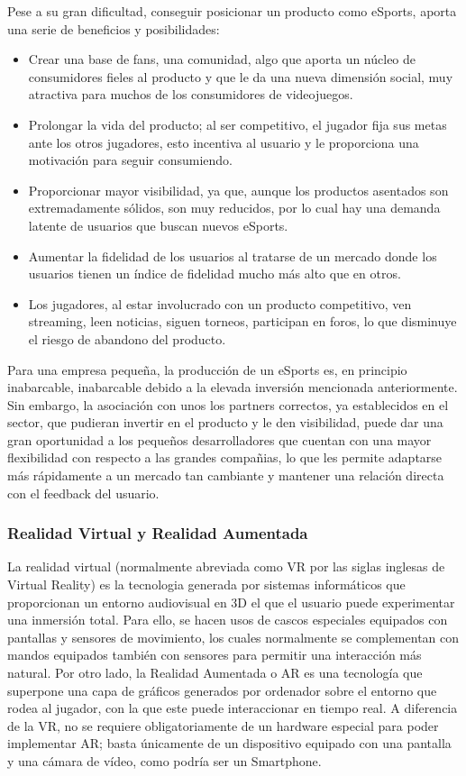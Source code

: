 Pese a su gran dificultad, conseguir posicionar un producto como eSports, aporta una serie de beneficios y posibilidades: 
\begin{itemize}
\item Crear una base de fans, una comunidad, algo que aporta un núcleo de consumidores fieles al producto y que le da una nueva dimensión social, muy atractiva para muchos de los consumidores de videojuegos.
\item Prolongar la vida del producto; al ser competitivo, el jugador fija sus metas ante los otros jugadores, esto incentiva al usuario y le proporciona una motivación para seguir consumiendo.
\item Proporcionar mayor visibilidad, ya que, aunque los productos asentados son extremadamente sólidos, son muy reducidos, por lo cual hay una demanda latente de usuarios que buscan nuevos eSports.
\item Aumentar la fidelidad de los usuarios al tratarse de un mercado donde los usuarios tienen un índice de fidelidad mucho más alto que en otros.
\item Los jugadores, al estar involucrado con un producto competitivo, ven streaming, leen noticias, siguen torneos, participan en foros, lo que disminuye el riesgo de abandono del producto.
\end{itemize}

Para una empresa pequeña, la producción de un eSports es, en principio inabarcable, inabarcable debido a la elevada inversión mencionada anteriormente. Sin embargo, la asociación con unos los partners correctos, ya establecidos en el sector, que pudieran invertir en el producto y le den visibilidad, puede dar una gran oportunidad a los pequeños desarrolladores que cuentan con una mayor flexibilidad con respecto a las grandes compañias, lo que les permite adaptarse más rápidamente a un mercado tan cambiante y mantener una relación directa con el feedback del usuario.

\subsubsection{Realidad Virtual y Realidad Aumentada}
La realidad virtual (normalmente abreviada como VR por las siglas inglesas de Virtual Reality) es la tecnologia generada por sistemas informáticos que proporcionan un entorno audiovisual en 3D el que el usuario puede experimentar una inmersión total. Para ello, se hacen usos de cascos especiales equipados con pantallas y sensores de movimiento, los cuales normalmente se complementan con mandos equipados también con sensores para permitir una interacción más natural.
Por otro lado, la Realidad Aumentada o AR es una tecnología que superpone una capa de gráficos generados por ordenador sobre el entorno que rodea al jugador, con la que este puede interaccionar en tiempo real. A diferencia de la VR, no se requiere obligatoriamente de un hardware especial para poder implementar AR; basta únicamente de un dispositivo equipado con una pantalla y una cámara de vídeo, como podría ser un Smartphone.

